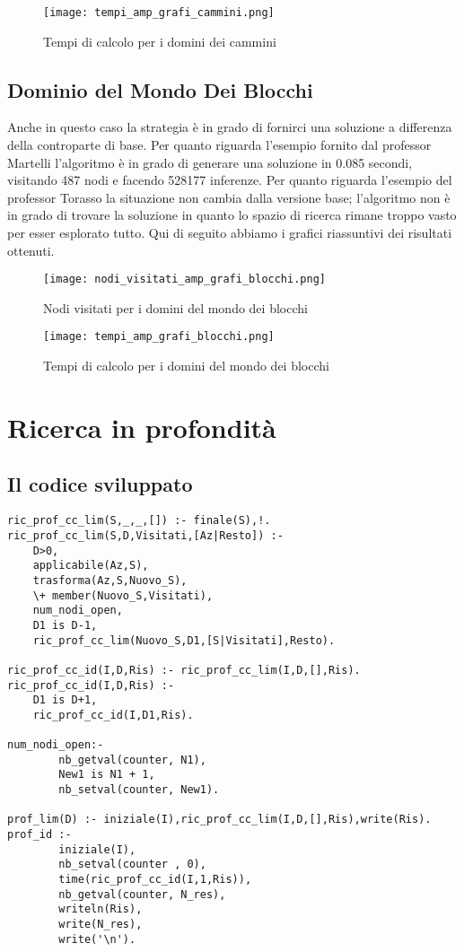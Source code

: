\begin{figure}[htp]
  \texttt{[image: tempi\_amp\_grafi\_cammini.png]}
  \caption{Tempi di calcolo per i domini dei cammini}
  \label{fig:figure2}
\end{figure}

\subsection{Dominio del Mondo Dei Blocchi}
Anche in questo caso la strategia è in grado di fornirci una soluzione a differenza della controparte di base. Per quanto riguarda l'esempio fornito dal professor Martelli l'algoritmo è in grado di generare una soluzione in 0.085 secondi, visitando 487 nodi e facendo 528177 inferenze. Per quanto riguarda l'esempio del professor Torasso la situazione non cambia dalla versione base; l'algoritmo non è in grado di trovare la soluzione in quanto lo spazio di ricerca rimane troppo vasto per esser esplorato tutto.
Qui di seguito abbiamo i grafici riassuntivi dei risultati ottenuti.

\begin{figure}[htp]
  \texttt{[image: nodi\_visitati\_amp\_grafi\_blocchi.png]}
  \caption{Nodi visitati per i domini del mondo dei blocchi}
  \label{fig:figure3}
\end{figure}

\begin{figure}[htp]
  \texttt{[image: tempi\_amp\_grafi\_blocchi.png]}
  \caption{Tempi di calcolo per i domini del mondo dei blocchi}
  \label{fig:figure4}
\end{figure}
\newpage
\section{Ricerca in profondità}

\subsection{Il codice sviluppato}

\begin{lstlisting}
ric_prof_cc_lim(S,_,_,[]) :- finale(S),!.
ric_prof_cc_lim(S,D,Visitati,[Az|Resto]) :-
    D>0,
    applicabile(Az,S),
    trasforma(Az,S,Nuovo_S),
    \+ member(Nuovo_S,Visitati),
    num_nodi_open,
    D1 is D-1,
    ric_prof_cc_lim(Nuovo_S,D1,[S|Visitati],Resto).

ric_prof_cc_id(I,D,Ris) :- ric_prof_cc_lim(I,D,[],Ris).
ric_prof_cc_id(I,D,Ris) :-
    D1 is D+1,
    ric_prof_cc_id(I,D1,Ris).

num_nodi_open:-
        nb_getval(counter, N1),
        New1 is N1 + 1,
        nb_setval(counter, New1).

prof_lim(D) :- iniziale(I),ric_prof_cc_lim(I,D,[],Ris),write(Ris).
prof_id :-
        iniziale(I),
        nb_setval(counter , 0),
        time(ric_prof_cc_id(I,1,Ris)),
        nb_getval(counter, N_res),
        writeln(Ris),
        write(N_res),
        write('\n').
\end{lstlisting}

